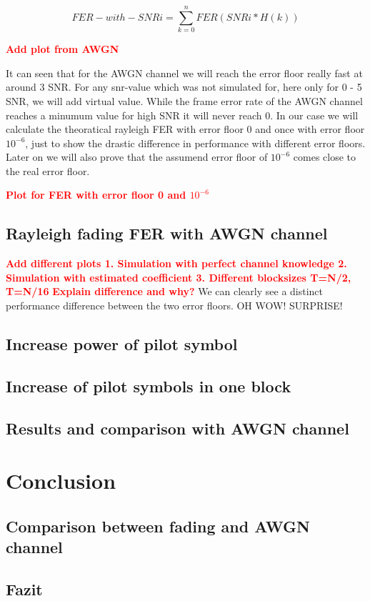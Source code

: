 \documentclass[12pt,oneside, reqno]{report}
\newcommand\boldred[1]{\textcolor{red}{\textbf{#1}}}
\begin{document}
\begin{equation}
\label{eq:theo}
FER-with-SNRi = \sum_{k = 0}^n FER(SNRi * H(k))
\end{equation}

\boldred{Add plot from AWGN}

It can seen that for the AWGN channel we will reach the error floor really fast at around 3 SNR. For any snr-value which was not simulated for, here only for 0 - 5 SNR, we will add virtual value. While the frame error rate of the AWGN channel reaches a minumum value for high SNR it will never reach 0. In our case we will calculate the theoratical rayleigh FER with error floor 0 and once with error floor $10^{-6}$, just to show the drastic difference in performance with different error floors. Later on we will also prove that the assumend error floor of 
$10^{-6}$ comes close to the real error floor. 

\boldred{Plot for FER with error floor 0 and $10^{-6}$}


\section{Rayleigh fading FER with AWGN channel}


\boldred{Add different plots 1. Simulation with perfect channel knowledge 2. Simulation with estimated coefficient 3. Different blocksizes T=N/2, T=N/16}
\boldred{Explain difference and why?}
We can clearly see a distinct performance difference between the two error floors. OH WOW! SURPRISE!

\section{Increase power of pilot symbol}

\section{Increase of pilot symbols in one block}


\section{Results and comparison with AWGN channel}


\chapter{Conclusion}

\section{Comparison between fading and AWGN channel}

\section{Fazit}


%
\end{document}
